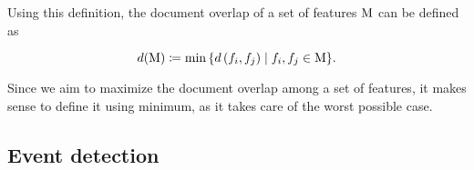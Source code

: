 Using this definition, the document overlap of a set of features $\text{M}$ can be defined as

\begin{equation}
	d(\text{M}) \coloneqq \min{\left\{ d\left( f_{i}, f_{j} \right) \mid f_{i}, f_{j} \in \text{M}\right\}}.
\end{equation}

Since we aim to maximize the document overlap among a set of features, it makes sense to define it using minimum, as it takes care of the worst possible case.

\subsection{Event detection}